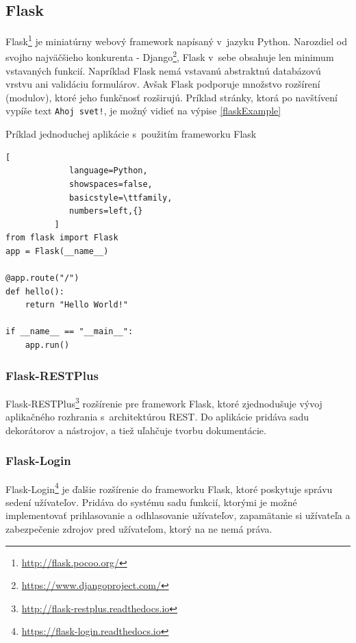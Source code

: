 \documentclass[slovak]{fitthesis}
\begin{document}
\subsection{Flask}\label{flask}
Flask\footnote{\url{http://flask.pocoo.org/}} je miniatúrny webový framework napísaný v~jazyku Python. Narozdiel od svojho najväčšieho konkurenta - Django\footnote{\url{https://www.djangoproject.com/}}, Flask v~sebe obsahuje len minimum vstavaných funkcií. Napríklad Flask nemá vstavanú abstraktnú databázovú vrstvu ani validáciu formulárov. Avšak Flask podporuje množstvo rozšírení (modulov), ktoré jeho funkčnosť rozširujú. Príklad stránky, ktorá po navštívení vypíše text \texttt{Ahoj svet!}, je možný vidieť na výpise \ref{flaskExample}



\begin{algorithm}[H]
  \caption{Príklad jednoduchej aplikácie s~použitím frameworku Flask}
  \label{flaskExample}
  \begin{lstlisting}[
             language=Python,
             showspaces=false,
             basicstyle=\ttfamily,
             numbers=left,{}
          ]
from flask import Flask
app = Flask(__name__)

@app.route("/")
def hello():
    return "Hello World!"

if __name__ == "__main__":
    app.run()
  \end{lstlisting}
\end{algorithm}

\subsubsection{Flask-RESTPlus}\label{RestPlusFlask}
Flask-RESTPlus\footnote{\url{http://flask-restplus.readthedocs.io}} rozšírenie pre framework Flask, ktoré zjednodušuje vývoj aplikačného rozhrania s~architektúrou REST. Do aplikácie pridáva sadu dekorátorov a nástrojov, a tiež uľahčuje tvorbu dokumentácie.

\subsubsection{Flask-Login}\label{Flask login}
Flask-Login\footnote{\url{https://flask-login.readthedocs.io}} je ďalšie rozšírenie do frameworku Flask, ktoré poskytuje správu sedení užívateľov. Pridáva do systému sadu funkcií, ktorými je možné implementovať prihlasovanie a odhlasovanie užívateľov, zapamätanie si užívateľa a zabezpečenie zdrojov pred užívateľom, ktorý na ne nemá práva.
\end{document}
